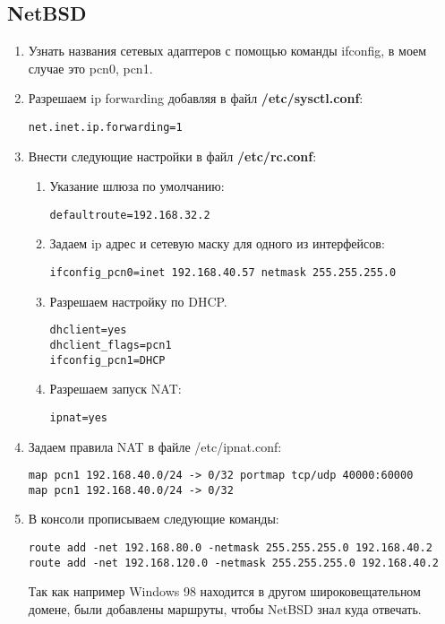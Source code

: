 \documentclass[14pt,a4paper,report]{report}
\begin{document}
\subsection{NetBSD}
\begin{enumerate}
\item Узнать названия сетевых адаптеров с помощью команды ifconfig, в моем случае это pcn0, pcn1.
\item Разрешаем ip forwarding добавляя в файл \textbf{/etc/sysctl.conf}:
\begin{lstlisting}[language={}]
net.inet.ip.forwarding=1
\end{lstlisting}
\item Внести следующие настройки в файл \textbf{/etc/rc.conf}:
\begin{enumerate}
\item Указание шлюза по умолчанию:
\begin{lstlisting}[language={}]
defaultroute=192.168.32.2
\end{lstlisting}
\item Задаем ip адрес и сетевую маску для одного из интерфейсов:
\begin{lstlisting}[language={}]
ifconfig_pcn0=inet 192.168.40.57 netmask 255.255.255.0
\end{lstlisting}
\item Разрешаем настройку по DHCP.
\begin{lstlisting}[language={}]
dhclient=yes	
dhclient_flags=pcn1
ifconfig_pcn1=DHCP
\end{lstlisting}
\item Разрешаем запуск NAT:
\begin{lstlisting}[language={}]
ipnat=yes
\end{lstlisting}
\end{enumerate}

\item Задаем правила NAT в файле /etc/ipnat.conf:
\begin{lstlisting}[language={}]
map pcn1 192.168.40.0/24 -> 0/32 portmap tcp/udp 40000:60000
map pcn1 192.168.40.0/24 -> 0/32
\end{lstlisting}
\item В консоли прописываем следующие команды:
\begin{lstlisting}[language={}]
route add -net 192.168.80.0 -netmask 255.255.255.0 192.168.40.2
route add -net 192.168.120.0 -netmask 255.255.255.0 192.168.40.2
\end{lstlisting}
Так как например Windows 98 находится в другом широковещательном домене, были добавлены маршруты, чтобы NetBSD знал куда отвечать.
\end{enumerate}
\end{document}
